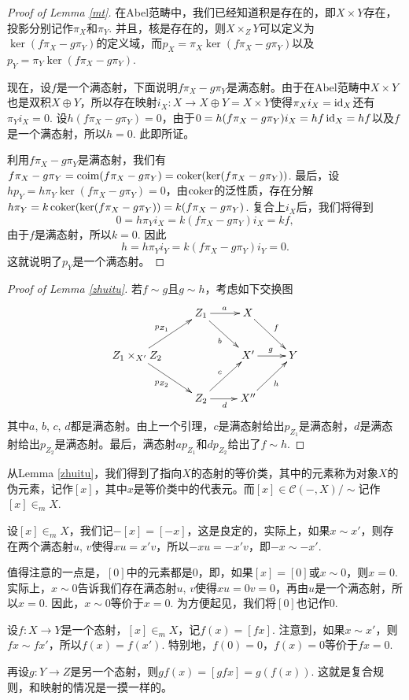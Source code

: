 \begin{proof}[Proof of Lemma \ref{mt}]
	在Abel范畴中，我们已经知道积是存在的，即$X\times Y$存在，投影分别记作$\pi_X$和$\pi_Y$. 并且，核是存在的，则$X\times_Z Y$可以定义为$\ker(f\pi_X-g\pi_Y)$的定义域，而$p_X=\pi_X\ker(f\pi_X-g\pi_Y)$以及$p_Y=\pi_Y\ker(f\pi_X-g\pi_Y)$.

	现在，设$f$是一个满态射，下面说明$f\pi_X-g\pi_Y$是满态射。由于在Abel范畴中$X\times Y$也是双积$X\oplus Y$，所以存在映射$i_X:X\to X\oplus Y=X\times Y$使得$\pi_Xi_X=\operatorname{id}_X$还有$\pi_Yi_X=0$. 设$h(f\pi_X-g\pi_Y)=0$，由于$0=h(f\pi_X-g\pi_Y)i_X=hf\operatorname{id}_X=hf$以及$f$是一个满态射，所以$h=0$. 此即所证。

	利用$f\pi_X-g\pi_Y$是满态射，我们有$f\pi_X-g\pi_Y=\operatorname{coim}(f\pi_X-g\pi_Y)=\operatorname{coker}(\ker(f\pi_X-g\pi_Y))$. 最后，设$hp_Y=h\pi_Y\ker(f\pi_X-g\pi_Y)=0$，由$\operatorname{coker}$的泛性质，存在分解$h\pi_Y=k\operatorname{coker}(\ker(f\pi_X-g\pi_Y))=k(f\pi_X-g\pi_Y)$. 复合上$i_X$后，我们将得到
	\[
	0=h\pi_Yi_X=k(f\pi_X-g\pi_Y)i_X=kf,
	\]
	由于$f$是满态射，所以$k=0$. 因此
	\[
	h=h\pi_Yi_Y=k(f\pi_X-g\pi_Y)i_Y=0.
	\]
	这就说明了$p_Y$是一个满态射。
\end{proof}

\begin{proof}[Proof of Lemma \ref{zhuitu}]
	若$f\sim g$且$g\sim h$，考虑如下交换图
	\[
	\xymatrix{
	&Z_1\ar[r]^a\ar[rd]_b&X\ar[rd]^f&\\
	Z_1\times_{X'} Z_2\ar[ru]^{p_{Z_1}}\ar[rd]_{p_{Z_2}}&&X'\ar[r]^g&Y\\
	&Z_2\ar[ru]^c\ar[r]_d&X''\ar[ru]_h&
	}
	\]
	其中$a$, $b$, $c$, $d$都是满态射。由上一个引理，$c$是满态射给出$p_{Z_1}$是满态射，$d$是满态射给出$p_{Z_2}$是满态射。最后，满态射$ap_{Z_1}$和$dp_{Z_2}$给出了$f\sim h$.
\end{proof}

\begin{para}
从Lemma \ref{zhuitu}，我们得到了指向$X$的态射的等价类，其中的元素称为对象$X$的伪元素，记作$[x]$，其中$x$是等价类中的代表元。而$[x]\in \mathcal{C}(-,X)/\sim$记作$[x]\in_m X$. 

设$[x]\in_m X$，我们记$-[x]=[-x]$，这是良定的，实际上，如果$x\sim x'$，则存在两个满态射$u$, $v$使得$xu=x'v$，所以$-xu=-x'v$，即$-x\sim -x'$. 

值得注意的一点是，$[0]$中的元素都是$0$，即，如果$[x]=[0]$或$x\sim 0$，则$x=0$. 实际上，$x\sim 0$告诉我们存在满态射$u$, $v$使得$xu=0v=0$，再由$u$是一个满态射，所以$x=0$. 因此，$x\sim 0$等价于$x=0$. 为方便起见，我们将$[0]$也记作$0$.

设$f:X\to Y$是一个态射，$[x]\in_m X$，记$f(x)=[fx]$. 注意到，如果$x\sim x'$，则$fx\sim fx'$，所以$f(x)=f(x')$. 特别地，$f(0)=0$，$f(x)=0$等价于$fx=0$.

再设$g:Y\to Z$是另一个态射，则$gf(x)=[gfx]=g(f(x))$. 这就是复合规则，和映射的情况是一摸一样的。
\end{para}

